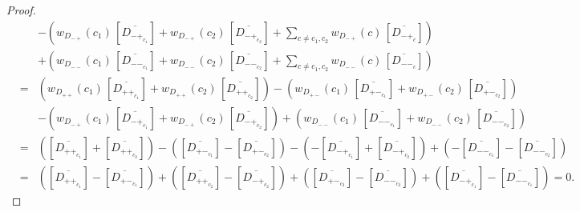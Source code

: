 \documentclass[11pt]{amsart}
\theoremstyle{noparens}
\numberwithin{equation}{section}
\numberwithin{equation}{section}
\begin{document}
\begin{proof}
\begin{eqnarray*}
& & - \left(  w_{D_{-+}}(c_1) \, [ \overline{D_{-+_{c_1}}} ] +  w_{D_{-+}}(c_2) \,  [\overline{D_{-+_{c_2}}}] + \sum_{c\neq c_1,c_2 }w_{D_{-+}} (c) \, [\overline{D_{-+_{c}}}]  \right)  \\
& & + \left(  w_{D_{--}}(c_1) \, [\overline{D_{--_{c_1}}}] + w_{D_{--}}(c_2) \, [\overline{D_{--_{c_2}}}] + \sum_{c\neq c_1,c_2 }w_{D_{--}} (c) \, [\overline{D_{--_{c}}}]  \right)  \\ 
&=& \left(  w_{D_{++}} (c_1) \, [\overline{D_{++_{c_1}}}] +  w_{D_{++}} (c_2) \, [\overline{D_{++_{c_2}}}] \right)  
 - \left(  w_{D_{+-}} (c_1) \, [\overline{D_{+-_{c_1}}}] +   w_{D_{+-}} (c_2) \, [\overline{D_{+-_{c_2}}}] \right) \\
& & - \left(  w_{D_{-+}}(c_1) \,  [\overline{D_{-+_{c_1}}}]  +  w_{D_{-+}}(c_2) \,  [\overline{D_{-+_{c_2}}}] \right)
+ \left(  w_{D_{--}}(c_1) \, [\overline{D_{--_{c_1}}}] + w_{D_{--}}(c_2) \, [\overline{D_{--_{c_2}}}] \right)  \\ 
&=& \left([\overline{D_{++_{c_1}}}] + [\overline{D_{++_{c_2}}}] \right) - \left([\overline{D_{+-_{c_1}}}] - [\overline{D_{+-_{c_2}}}] \right)  
 -\left(-[\overline{D_{-+_{c_1}}}] + [\overline{D_{-+_{c_2}}}] \right) + \left(-[\overline{D_{--_{c_1}}}] - [\overline{D_{--_{c_2}}}] \right) \\ 
&=& \left([\overline{D_{++_{c_1}}}] - [\overline{D_{+-_{c_1}}}] \right) + \left( [\overline{D_{++_{c_2}}}] - [\overline{D_{-+_{c_2}}}] \right)   
 + \left( [\overline{D_{+-_{c_2}}}] - [\overline{D_{--_{c_2}}}] \right) + \left([\overline{D_{-+_{c_1}}}] - [\overline{D_{--_{c_1}}}] \right) = 0. 
\end{eqnarray*}


\end{proof}
\end{document}
